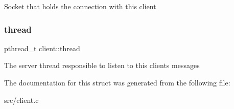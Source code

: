 Socket that holds the connection with this client \mbox{\label{structclient_a529fa20e309347262616a00ad0ad3d93}} 
\subsubsection{\texorpdfstring{thread}{thread}}
{\footnotesize\ttfamily pthread\+\_\+t client\+::thread}

The server thread responsible to listen to this client\textquotesingle{}s messages 

The documentation for this struct was generated from the following file\+:\begin{DoxyCompactItemize}
\item 
src/client.\+c\end{DoxyCompactItemize}
